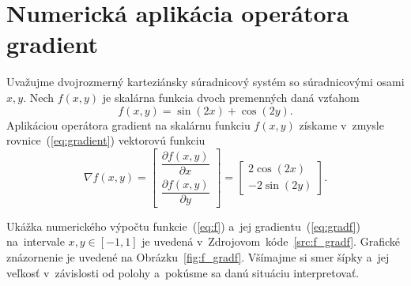 \documentclass[a4paper, 12pt]{book}
\begin{document}

\appendix
\chapter{Numerická aplikácia operátora gradient}
\label{app:numerical_application_of_gradient}

Uvažujme dvojrozmerný karteziánsky súradnicový systém so súradnicovými osami 
$x, y$.  Nech $f(x, y)$ je skalárna funkcia dvoch premenných daná vzťahom
%
\begin{equation}
\label{eq:f}
f(x, y) = \sin(2x) + \cos(2y){.}
\end{equation}
%
Aplikáciou operátora gradient na skalárnu funkciu $f(x, y)$ získame v~zmysle
rovnice~(\ref{eq:gradient}) vektorovú funkciu
%
\begin{equation}
\label{eq:gradf}
\nabla f(x, y) =
\begin{bmatrix}
\dfrac{\partial f(x, y)}{\partial x} \\[2ex]
\dfrac{\partial f(x, y)}{\partial y}
\end{bmatrix}
=
\begin{bmatrix}
2 \cos(2x) \\[2ex]
-2 \sin(2y)
\end{bmatrix}
{.}
\end{equation}

Ukážka numerického výpočtu funkcie~(\ref{eq:f}) a~jej 
gradientu~(\ref{eq:gradf}) na~intervale $x, y \in [-1, 1]$ je uvedená 
v~Zdrojovom~kóde~\ref{src:f_gradf}.  Grafické znázornenie je uvedené na 
Obrázku~\ref{fig:f_gradf}.  Všímajme si smer šípky a~jej veľkosť v~závislosti 
od polohy a~pokúsme sa danú situáciu interpretovať.


\end{document}
